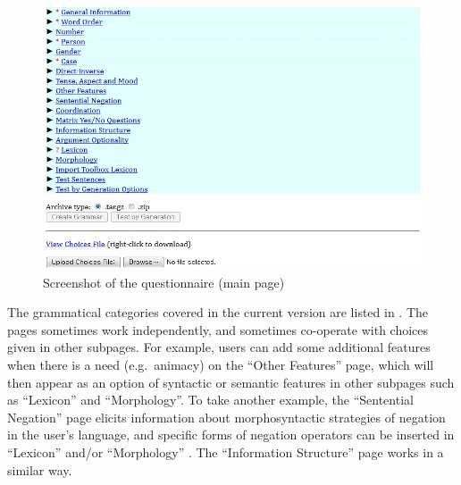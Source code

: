 \begin{figure}
\begin{center} 
\includegraphics[width=.9\textwidth]{screenshot/ss1.jpg}
\caption{Screenshot of the questionnaire (main page)}
\label{screenshot:main}
\end{center}
\end{figure}



The grammatical categories covered in the current version are listed
in .  The pages sometimes work
independently, and sometimes co-operate with choices given in other
subpages.  For example, users can add some additional features when
there is a need (e.g.\ animacy) on the ``Other Features'' page, which
will then appear as an option of syntactic or semantic features in
other subpages such as ``Lexicon'' and ``Morphology''.  To take
another example, the ``Sentential Negation'' page elicits information
about morphosyntactic strategies of negation in the user's language,
and specific forms of negation operators can be inserted in
``Lexicon'' and/or ``Morphology'' \citep{crowgey:12}. The
``Information Structure'' page works in a similar way.


